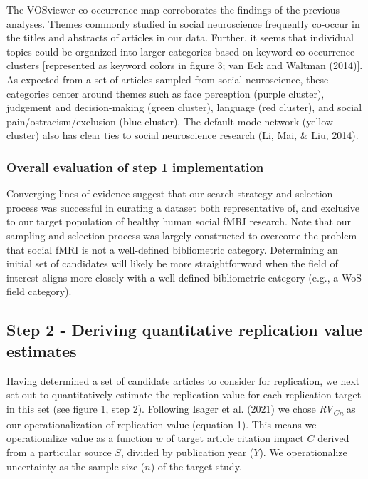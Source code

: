 \documentclass[
  english,
  man,floatsintext]{apa6}
\begin{document}
The VOSviewer co-occurrence map corroborates the findings of the previous analyses. Themes commonly studied in social neuroscience frequently co-occur in the titles and abstracts of articles in our data. Further, it seems that individual topics could be organized into larger categories based on keyword co-occurrence clusters {[}represented as keyword colors in figure 3; van Eck and Waltman (2014){]}. As expected from a set of articles sampled from social neuroscience, these categories center around themes such as face perception (purple cluster), judgement and decision-making (green cluster), language (red cluster), and social pain/ostracism/exclusion (blue cluster). The default mode network (yellow cluster) also has clear ties to social neuroscience research (Li, Mai, \& Liu, 2014).

\hypertarget{overall-evaluation-of-step-1-implementation}{%
\subsubsection{Overall evaluation of step 1 implementation}\label{overall-evaluation-of-step-1-implementation}}

Converging lines of evidence suggest that our search strategy and selection process was successful in curating a dataset both representative of, and exclusive to our target population of healthy human social fMRI research. Note that our sampling and selection process was largely constructed to overcome the problem that social fMRI is not a well-defined bibliometric category. Determining an initial set of candidates will likely be more straightforward when the field of interest aligns more closely with a well-defined bibliometric category (e.g., a WoS field category).

\hypertarget{step-2---deriving-quantitative-replication-value-estimates}{%
\subsection{Step 2 - Deriving quantitative replication value estimates}\label{step-2---deriving-quantitative-replication-value-estimates}}

Having determined a set of candidate articles to consider for replication, we next set out to quantitatively estimate the replication value for each replication target in this set (see figure 1, step 2). Following Isager et al. (2021) we chose \emph{RV\textsubscript{Cn}} as our operationalization of replication value (equation 1). This means we operationalize value as a function \(w\) of target article citation impact \(C\) derived from a particular source \(S\), divided by publication year (\(Y\)). We operationalize uncertainty as the sample size (\(n\)) of the target study.
\end{document}
